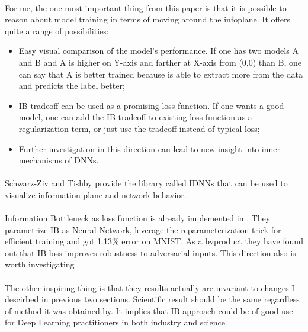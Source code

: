 \documentclass[a4paper,14pt]{extarticle}
\begin{document}
\paragraph{}
For me, the one most important thing from this paper is that it is possible to reason about model training in terms of moving around the infoplane. It offers quite a range of possibilities:
\begin{itemize}
	\item Easy visual comparison of the model's performance. If one has two models A and B and A is higher on Y-axis and farther at X-axis from (0,0) than B, one can say that A is better trained because is able to extract more from the data and predicts the label better;
	\item IB tradeoff can be used as a promising loss function. If one wants a good model, one can add the IB tradeoff to existing loss function as a regularization term, or just use the tradeoff instead of typical loss;
	\item Further investigation in this direction can lead to new insight into inner mechanisms of DNNs.
\end{itemize}
\paragraph{}
Schwarz-Ziv and Tishby provide the library called IDNNs \cite{idnns} that can be used to visualize information plane and network behavior.
\paragraph{}
Information Bottleneck as loss function is already implemented in \cite{alemi2016deep}. They parametrize IB as Neural Network, leverage the reparameterization trick for efficient training and got 1.13\% error on MNIST. As a byproduct they have found out that IB loss improves robustness to adversarial inputs. This direction also is worth investigating
\paragraph{}
The other inspiring thing is that they results actually are invariant to changes I descirbed in previous two sections. Scientific result should be the same regardless of method it was obtained by. It implies that IB-approach could be of good use for Deep Learning practitioners in both industry and science.
\newpage
\printbibliography
\end{document}
